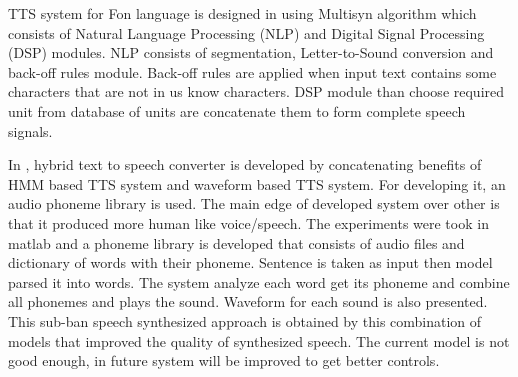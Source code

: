TTS system for Fon language is designed in \cite{dagba2014text} using Multisyn algorithm \cite{clark2007multisyn}
which consists of Natural Language Processing (NLP) and Digital Signal Processing (DSP)
modules. NLP consists of segmentation, Letter-to-Sound conversion and back-off rules module.
Back-off rules are applied when input text contains some characters that are not in us know
characters. DSP module than choose required unit from database of units are concatenate them to
form complete speech signals.

In \cite{ganai2016text}, hybrid text to speech converter is developed by
concatenating benefits of HMM based TTS system and waveform based TTS system. For developing it, an audio phoneme library is used. The main
edge of developed system over other is that it produced more human like voice/speech. The experiments were took in
matlab and a phoneme library is developed that consists of audio files and dictionary of words with their phoneme. Sentence is
taken as input then model parsed it into words. The system analyze each word get its phoneme and combine all phonemes
and plays the sound. Waveform for each sound is also presented. This sub-ban speech synthesized approach is obtained by
this combination of models that improved the quality of synthesized speech. The current model is not good enough, in future
system will be improved to get better controls.

